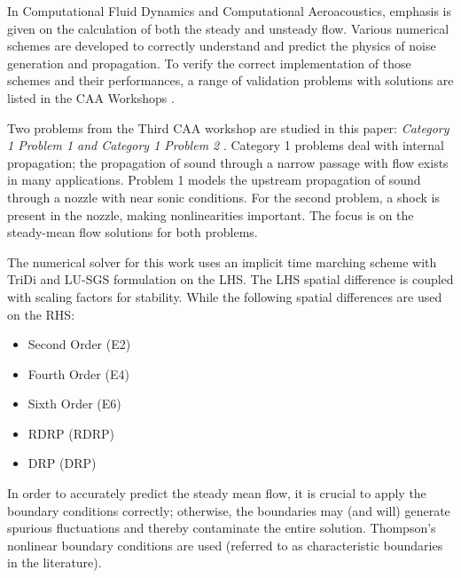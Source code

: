\documentclass[conf]{new-aiaa}
\begin{document}
In Computational Fluid Dynamics and Computational Aeroacoustics, emphasis is given on the calculation of both the steady and unsteady flow. 
Various numerical schemes are developed to correctly understand and predict the physics of noise generation and propagation. 
To verify the correct implementation of those schemes and their performances, a range of validation problems with solutions are listed in the CAA Workshops \cite{CAA1, CAA2, CAA3}.

Two problems from the Third CAA workshop are studied in this paper: \textit{Category 1 Problem 1 and Category 1 Problem 2} \cite{CAA3}. 
Category 1 problems deal with internal propagation; 
the propagation of sound through a narrow passage with flow exists in many applications. 
Problem 1 models the upstream propagation of sound through a nozzle with near sonic conditions. 
For the second problem, a shock is present in the nozzle, making nonlinearities important. 
The focus is on the steady-mean flow solutions for both problems.  

The numerical solver for this work uses an implicit time marching scheme with TriDi and LU-SGS formulation on the LHS. 
The LHS spatial difference is coupled with scaling factors for stability. 
While the following spatial differences are used on the RHS:
\begin{itemize}
	\item Second Order (E2)
	\item Fourth Order (E4)
	\item Sixth Order (E6)
	\item RDRP  (RDRP)
	\item DRP  (DRP)
\end{itemize}

In order to accurately predict the steady mean flow, it is crucial to apply the boundary conditions correctly; otherwise, the boundaries may (and will) generate spurious fluctuations and thereby contaminate the entire solution. 
Thompson's nonlinear boundary conditions are used (referred to as characteristic boundaries in the literature).  
\end{document}
